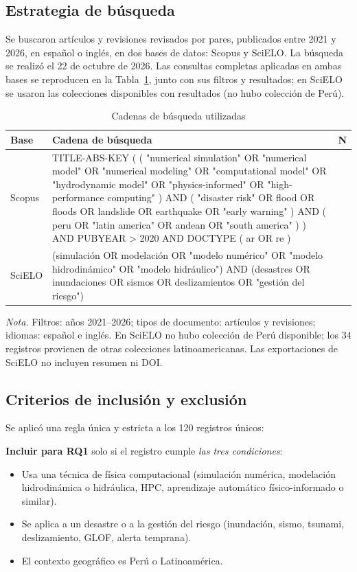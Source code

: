 \documentclass[12pt,a4paper]{article}
\begin{document}
\subsection{Estrategia de búsqueda}
Se buscaron artículos y revisiones revisados por pares, publicados entre 2021 y 2026, en español o inglés, en dos bases de datos: Scopus y SciELO. La búsqueda se realizó el 22 de octubre de 2026. Las consultas completas aplicadas en ambas bases se reproducen en la Tabla~\ref{tab:queries}, junto con sus filtros y resultados; en SciELO se usaron las colecciones disponibles con resultados (no hubo colección de Perú).

\begin{table}[H]
  \centering
  \caption{Cadenas de búsqueda utilizadas}
  \label{tab:queries}
  \begin{tabularx}{\textwidth}{@{}p{2.1cm}>{\raggedright\arraybackslash\ttfamily\small}X>{\centering\arraybackslash}p{1.1cm}@{}}
    \toprule
    Base & Cadena de búsqueda & N \\
    \midrule
    Scopus & TITLE-ABS-KEY ( ( "numerical simulation" OR "numerical model" OR "numerical modeling" OR "computational model" OR "hydrodynamic model" OR "physics-informed" OR "high-performance computing" ) AND ( "disaster risk" OR flood OR floods OR landslide OR earthquake OR "early warning" ) AND ( peru OR "latin america" OR andean OR "south america" ) ) AND PUBYEAR > 2020 AND DOCTYPE ( ar OR re ) & 86 \\
    SciELO & (simulación OR modelación OR "modelo numérico" OR "modelo hidrodinámico" OR "modelo hidráulico") AND (desastres OR inundaciones OR sismos OR deslizamientos OR "gestión del riesgo") & 34 \\
    \bottomrule
  \end{tabularx}
  \par\smallskip\noindent\small\textit{Nota.} Filtros: años 2021--2026; tipos de documento: artículos y revisiones; idiomas: español e inglés. En SciELO no hubo colección de Perú disponible; los 34 registros provienen de otras colecciones latinoamericanas. Las exportaciones de SciELO no incluyen resumen ni DOI.
\end{table}

\subsection{Criterios de inclusión y exclusión}
Se aplicó una regla única y estricta a los 120 registros únicos:

\textbf{Incluir para RQ1} solo si el registro cumple \textit{las tres condiciones}:
\begin{itemize}
  \item Usa una técnica de física computacional (simulación numérica, modelación hidrodinámica o hidráulica, HPC, aprendizaje automático físico-informado o similar).
  \item Se aplica a un desastre o a la gestión del riesgo (inundación, sismo, tsunami, deslizamiento, GLOF, alerta temprana).
  \item El contexto geográfico es Perú o Latinoamérica.
\end{itemize}
\end{document}
